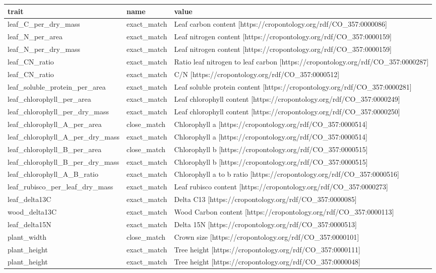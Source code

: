 \documentclass[
  letterpaper,
  DIV=11,
  numbers=noendperiod]{scrartcl}
\begin{document}
\begin{tabular}{>{\raggedright\arraybackslash}p{6cm}>{\raggedright\arraybackslash}p{3cm}>{\raggedright\arraybackslash}p{8cm}}
\toprule
trait & name & value\\
\midrule
leaf\_C\_per\_dry\_mass & exact\_match & Leaf carbon content [https://cropontology.org/rdf/CO\_357:0000086]\\
leaf\_N\_per\_area & exact\_match & Leaf nitrogen content [https://cropontology.org/rdf/CO\_357:0000159]\\
leaf\_N\_per\_dry\_mass & exact\_match & Leaf nitrogen content [https://cropontology.org/rdf/CO\_357:0000159]\\
leaf\_CN\_ratio & exact\_match & Ratio leaf nitrogen to leaf carbon [https://cropontology.org/rdf/CO\_357:0000287]\\
leaf\_CN\_ratio & exact\_match & C/N [https://cropontology.org/rdf/CO\_357:0000512]\\
\addlinespace
leaf\_soluble\_protein\_per\_area & exact\_match & Leaf soluble protein content [https://cropontology.org/rdf/CO\_357:0000281]\\
leaf\_chlorophyll\_per\_area & exact\_match & Leaf chlorophyll content [https://cropontology.org/rdf/CO\_357:0000249]\\
leaf\_chlorophyll\_per\_dry\_mass & exact\_match & Leaf chlorophyll content [https://cropontology.org/rdf/CO\_357:0000250]\\
leaf\_chlorophyll\_A\_per\_area & close\_match & Chlorophyll a [https://cropontology.org/rdf/CO\_357:0000514]\\
leaf\_chlorophyll\_A\_per\_dry\_mass & exact\_match & Chlorophyll a [https://cropontology.org/rdf/CO\_357:0000514]\\
\addlinespace
leaf\_chlorophyll\_B\_per\_area & close\_match & Chlorophyll b [https://cropontology.org/rdf/CO\_357:0000515]\\
leaf\_chlorophyll\_B\_per\_dry\_mass & exact\_match & Chlorophyll b [https://cropontology.org/rdf/CO\_357:0000515]\\
leaf\_chlorophyll\_A\_B\_ratio & exact\_match & Chlorophyll a to b ratio [https://cropontology.org/rdf/CO\_357:0000516]\\
leaf\_rubisco\_per\_leaf\_dry\_mass & exact\_match & Leaf rubisco content [https://cropontology.org/rdf/CO\_357:0000273]\\
leaf\_delta13C & exact\_match & Delta C13 [https://cropontology.org/rdf/CO\_357:0000085]\\
\addlinespace
wood\_delta13C & exact\_match & Wood Carbon content [https://cropontology.org/rdf/CO\_357:0000113]\\
leaf\_delta15N & exact\_match & Delta 15N [https://cropontology.org/rdf/CO\_357:0000513]\\
plant\_width & close\_match & Crown size [https://cropontology.org/rdf/CO\_357:0000101]\\
plant\_height & exact\_match & Tree height [https://cropontology.org/rdf/CO\_357:0000111]\\
plant\_height & exact\_match & Tree height [https://cropontology.org/rdf/CO\_357:0000048]\\
\bottomrule
\end{tabular}
\end{document}
